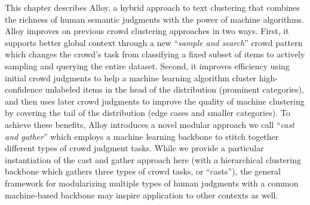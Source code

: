 This chapter describes Alloy, a hybrid approach to text clustering that combines the richness of human semantic judgments with the power of machine algorithms. Alloy improves on previous crowd clustering approaches in two ways. First, it supports better global context through a new ``\emph{sample and search}'' crowd pattern which changes the crowd's task from classifying a fixed subset of items to actively sampling and querying the entire dataset. Second, it improves efficiency using initial crowd judgments to help a machine learning algorithm cluster high-confidence unlabeled items in the head of the distribution (prominent categories), and then uses later crowd judgments to improve the quality of machine clustering by covering the tail of the distribution (edge cases and smaller categories). 
To achieve these benefits, Alloy introduces a novel modular approach we call ``\emph{cast and gather}'' which employs a machine learning backbone to stitch together different types of crowd judgment tasks. While we provide a particular instantiation of the cast and gather approach here (with a hierarchical clustering backbone which gathers three types of crowd tasks, or ``casts''), the general framework for modularizing multiple types of human judgments with a common machine-based backbone may inspire application to other contexts as well.


% 

